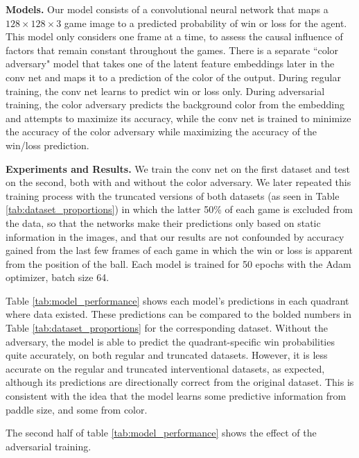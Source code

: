 \documentclass{article}
\begin{document}
\textbf{Models.} Our model consists of a convolutional neural network that maps a $128\times 128 \times 3$ game image to a predicted probability of win or loss for the agent. This model only considers one frame at a time, to assess the causal influence of factors that remain constant throughout the games. There is a separate ``color adversary" model that takes one of the latent feature embeddings later in the conv net and maps it to a prediction of the color of the output. During regular training, the conv net learns to predict win or loss only. During adversarial training, the color adversary predicts the background color from the embedding and attempts to maximize its accuracy, while the conv net is trained to minimize the accuracy of the color adversary while maximizing the accuracy of the win/loss prediction.

\textbf{Experiments and Results.} We train the conv net on the first dataset and test on the second, both with and without the color adversary. We later repeated this training process with the truncated versions of both datasets (as seen in Table \ref{tab:dataset_proportions}) in which the latter 50\% of each game is excluded from the data, so that the networks make their predictions only based on static information in the images, and that our results are not confounded by accuracy gained from the last few frames of each game in which the win or loss is apparent from the position of the ball. Each model is trained for 50 epochs with the Adam optimizer, batch size 64. %

Table \ref{tab:model_performance} shows each model's predictions in each quadrant where data existed. These predictions can be compared to the bolded numbers in Table \ref{tab:dataset_proportions} for the corresponding dataset. Without the adversary, the model is able to predict the quadrant-specific win probabilities quite accurately, on both regular and truncated datasets. However, it is less accurate on the regular and truncated interventional datasets, as expected, although its predictions are directionally correct from the original dataset. This is consistent with the idea that the model learns some predictive information from paddle size, and some from color.

The second half of table \ref{tab:model_performance} shows the effect of the adversarial training.
\end{document}
